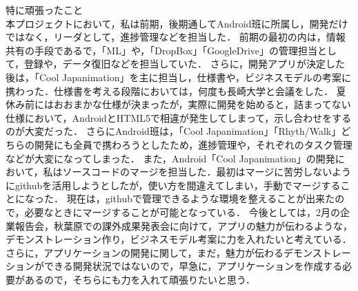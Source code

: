 \per
特に頑張ったこと
\per
\\
本プロジェクトにおいて，私は前期，後期通してAndroid班に所属し，開発だけではなく，リーダとして，進捗管理などを担当した．
前期の最初の内は，情報共有の手段であるで，「ML」や，「DropBox」「GoogleDrive」の管理担当として，登録や，データ復旧などを担当していた．
さらに，開発アプリが決定した後は，「Cool Japanimation」を主に担当し，仕様書や，ビジネスモデルの考案に携わった．仕様書を考える段階においては，何度も長崎大学と会議をした．
夏休み前にはおおまかな仕様が決まったが，実際に開発を始めると，詰まってない仕様において，AndroidとHTML5で相違が発生してしまって，示し合わせをするのが大変だった．
さらにAndroid班は，「Cool Japanimation」「Rhyth/Walk」どちらの開発にも全員で携わろうとしたため，進捗管理や，それぞれのタスク管理などが大変になってしまった．
また，Android「Cool Japanimation」の開発において，私はソースコードのマージを担当した．最初はマージに苦労しないようにgithubを活用しようとしたが，使い方を間違えてしまい，手動でマージすることになった．
現在は，githubで管理できるような環境を整えることが出来たので，必要なときにマージすることが可能となっている．
\per
今後としては，2月の企業報告会，秋葉原での課外成果発表会に向けて，アプリの魅力が伝わるような，デモンストレーション作り，ビジネスモデル考案に力を入れたいと考えている．
さらに，アプリケーションの開発に関して，まだ，魅力が伝わるデモンストレーションができる開発状況ではないので，早急に，アプリケーションを作成する必要があるので，そちらにも力を入れて頑張りたいと思う．
